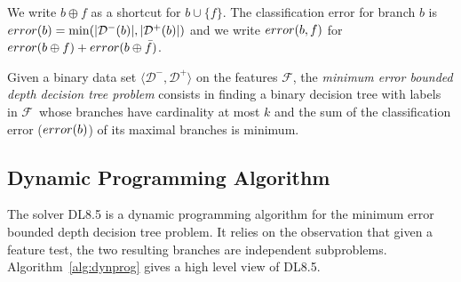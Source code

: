 \documentclass{llncs}
\newcommand{\tru}[0]{\texttt{true}}
\def\posclass{+}
\def\negclass{-}
\def\datasymb{D}
\newcommand{\setex}[1]{\ensuremath{{\mathcal \datasymb}^{#1}}\xspace}
\newcommand{\posex}{{\setex{\posclass}}\xspace}
\newcommand{\negex}{{\setex{\negclass}}\xspace}
\newcommand{\features}{\ensuremath{{\mathcal F}}\xspace}
\newcommand{\maxd}[0]{\ensuremath{k}}
\newcommand{\afeat}[0]{\ensuremath{f}}
\newcommand{\best}[1][]{\ensuremath{\ifthenelse{\equal{#1}{}}{{best}}{{best({#1})}}}}
\newcommand{\error}[1][]{\ensuremath{\ifthenelse{\equal{#1}{}}{{error}}{{error({{#1}})}}}}
\newcommand{\classlabel}[1][]{\ensuremath{\ifthenelse{\equal{#1}{}}{{y}}{{y({{#1}})}}}}
\newcommand{\abranch}[0]{\ensuremath{b}}
\newcommand{\mdepth}[0]{\ensuremath{k}}
\newcommand{\grow}[2]{\ensuremath{{#1}\oplus{#2}}}
\begin{document}
We write $\grow{\abranch}{\afeat}$ as a shortcut for $\abranch \cup \{\afeat\}$.
The classification error for branch $\abranch$ is $\error[\abranch]=\min(|\negex(\abranch)|, |\posex(\abranch)|)$
and we write $\error[\abranch,\afeat]$ for $\error[\grow{\abranch}{\afeat}] + \error[\grow{\abranch}{\bar{\afeat}}]$.

\medskip

Given a binary data set $\langle \negex,\posex \rangle$ on the features \features, %
the \emph{minimum error bounded depth decision tree problem} consists in finding a binary decision tree with labels in \features\ whose branches have cardinality at most $\mdepth$ and the sum of the classification error ($\error[\abranch]$) of its maximal branches is minimum.


\subsection{Dynamic Programming Algorithm}

The solver DL8.5 is a dynamic programming algorithm for the minimum error bounded depth decision tree problem. It relies on the observation that given a feature test, the two resulting branches are independent subproblems. Algorithm~\ref{alg:dynprog} gives a high level view of DL8.5.


	
\end{document}
